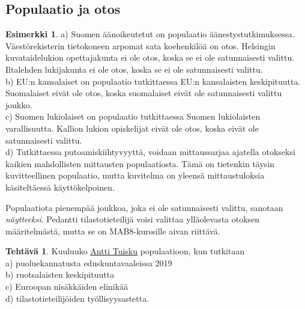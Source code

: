 \documentclass[12pt,leqno,a4paper,oneside]{amsart}
\theoremstyle{definition}
\newtheorem{example}[proclaim]{Esimerkki}
\newtheorem{exercise}{Tehtävä}
\theoremstyle{remark}
\numberwithin{equation}{section}
\begin{document}
\subsection{Populaatio ja otos}
\hspace{10pt}


\begin{example}
 a) Suomen äänoikeutetut on populaatio äänestys\-tutkimuksessa. Väestörekisterin tietokoneen arpomat sata koehenkilöä on otos. Helsingin kuvataidelukion
 opettajakunta ei ole otos, koska se ei ole satunnaisesti valittu. Iltalehden lukijakunta ei ole otos, koska se ei ole satunnaisesti valittu.\\
 b) EU:n kansalaiset on populaatio tutkittaessa EU:n kansalaisten keskipituutta. Suomalaiset eivät ole otos, koska suomalaiset eivät ole satunnaisesti
 valittu joukko.\\
 c) Suomen lukiolaiset on populaatio tutkittaessa Suomen lukiolaisten varallisuutta. Kallion lukion opiskelijat eivät ole otos, koska 
 eivät ole satunnaisesti valittu.\\
 d) Tutkittaessa putoamiskiihtyvyyttä, voidaan mittaussarjaa ajatella otokseksi kaikien mahdollisten mittausten populaatiosta. Tämä on tie\-ten\-kin
 täysin kuvitteellinen populaatio, mutta kuvitelma on yleensä mittaustuloksia käsiteltäessä käyttökelpoinen.
\end{example}

Populaatiota pienempää joukkoa, joka ei ole satunnaisesti valittu, sa\-no\-taan \emph{näytteeksi}. Pedantti tilastotieteilijä voisi valittaa ylläolevasta
otoksen määritelmästä, mutta se on MAB8-kurssille aivan riittävä.

\begin{exercise}
 Kuuluuko \href{https://fi.wikipedia.org/wiki/Antti_Tuisku}{Antti Tuisku} populaatioon, kun tutkitaan\\
 a) puoluekannatusta eduskuntavaaleissa 2019\\
 b) ruotsalaisten keskipituutta\\
 c) Euroopan nisäkkäiden elinikää\\
 d) tilastotieteilijöiden työllisyysastetta.
\end{exercise}
\end{document}
